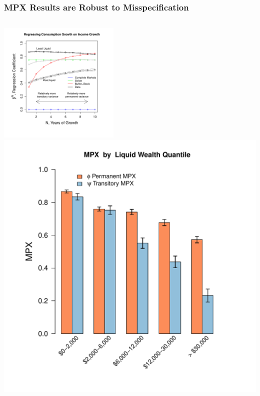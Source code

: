 \documentclass{beamer}
\begin{document}
\frame
{
	\frametitle{MPX Results are Robust to Misspecification}
	\begin{columns}
		\centering
		\includegraphics[height=5.8cm]{../Figures/basic_regression_liquid_wealth_level_lincome_head.pdf}
		\centering
		\includegraphics[scale=0.35]{../Figures/MPXByLiquidWealth_level_lincome_head.pdf}
	\end{columns}
	\hyperlink{MPXbyNetWealth}{}
}
\end{document}
